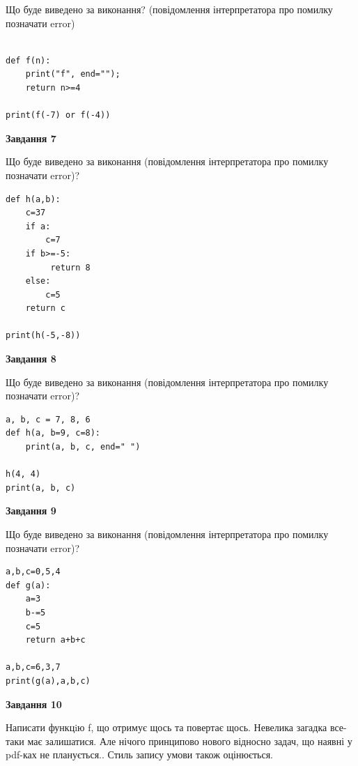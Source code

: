\documentclass[12pt, ukrainian]{article}
\begin{document}
{\begin {large}
Що буде виведено за виконання? (повідомлення інтерпретатора про помилку позначати error)\par
\begin{verbatim}

def f(n):
    print("f", end="");
    return n>=4

print(f(-7) or f(-4))
\end{verbatim}

{\begin {center}\textbf{Завдання 7}\end {center}}

Що буде виведено за виконання (повідомлення інтерпретатора про помилку позначати error)?\par
\begin{verbatim}
def h(a,b):
    c=37
    if a:
        c=7
    if b>=-5:
         return 8
    else: 
        c=5
    return c

print(h(-5,-8))
\end{verbatim}

{\begin {center}\textbf{Завдання 8}\end {center}}

Що буде виведено за виконання (повідомлення інтерпретатора про помилку позначати error)?\par
\begin{verbatim}
a, b, c = 7, 8, 6
def h(a, b=9, c=8):
    print(a, b, c, end=" ")

h(4, 4)
print(a, b, c)
\end{verbatim}

{\begin {center}\textbf{Завдання 9}\end {center}}

Що буде виведено за виконання (повідомлення інтерпретатора про помилку позначати error)?\par
\begin{verbatim}
a,b,c=0,5,4
def g(a):
    a=3
    b-=5
    c=5
    return a+b+c

a,b,c=6,3,7
print(g(a),a,b,c)
\end{verbatim}

{\begin {center}\textbf{Завдання 10}\end {center}}


Написати функцiю f, що отримує щось та повертає щось. Невелика загадка все-таки має залишатися. Але нічого принципово нового відносно задач, що наявні у pdf-ках не планується.. Стиль запису умови також оцінюється.\par
\end {large}}
\newpage
\end{document}
